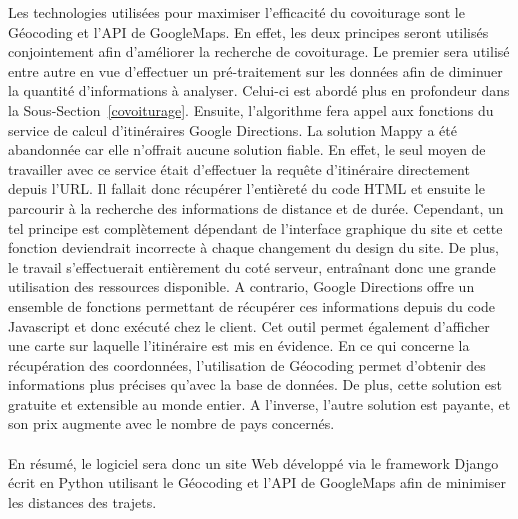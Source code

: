\documentclass[12pt, a4paper, oneside]{article}
\begin{document}
    \indent Les technologies utilisées pour maximiser l'efficacité du covoiturage sont le Géocoding et l'API de GoogleMaps. En effet, les deux principes seront utilisés conjointement afin d'améliorer la recherche de covoiturage. Le premier sera utilisé entre autre en vue d'effectuer un pré-traitement sur les données afin de diminuer la quantité d'informations à analyser. Celui-ci est abordé plus en profondeur dans la Sous-Section~\ref{covoiturage}. Ensuite, l'algorithme fera appel aux fonctions du service de calcul d'itinéraires Google Directions. La solution Mappy a été abandonnée car elle n'offrait aucune solution fiable. En effet, le seul moyen de travailler avec ce service était d'effectuer la requête d'itinéraire directement depuis l'URL. Il fallait donc récupérer l'entièreté du code HTML et ensuite le parcourir à la recherche des informations de distance et de durée. Cependant, un tel principe est complètement dépendant de l'interface graphique du site et cette fonction deviendrait incorrecte à chaque changement du design du site. De plus, le travail s'effectuerait entièrement du coté serveur, entraînant donc une grande utilisation des ressources disponible. A contrario, Google Directions offre un ensemble de fonctions permettant de récupérer ces informations depuis du code Javascript et donc exécuté chez le client. Cet outil permet également d'afficher une carte sur laquelle l'itinéraire est mis en évidence. En ce qui concerne la récupération des coordonnées, l'utilisation de Géocoding permet d'obtenir des informations plus précises qu'avec la base de données. De plus, cette solution est gratuite et extensible au monde entier. A l'inverse, l'autre solution est payante, et son prix augmente avec le nombre de pays concernés.\\\\
    \indent En résumé, le logiciel sera donc un site Web développé via le framework Django écrit en Python utilisant le Géocoding et l'API de GoogleMaps afin de minimiser les distances des trajets.
\end{document}
